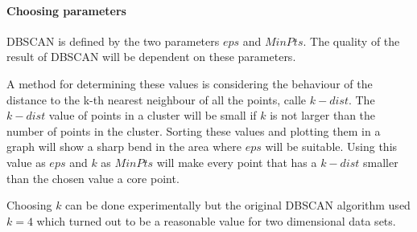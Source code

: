 \paragraph{Choosing parameters}
DBSCAN is defined by the two parameters $ eps $ and $ MinPts $.
The quality of the result of DBSCAN will be dependent on these parameters.

A method for determining these values is considering the behaviour of the distance to the k-th nearest neighbour of all the points, calle $ k-dist $.
The $ k-dist $ value of points in a cluster will be small if $ k $ is not larger than the number of points in the cluster.
Sorting these values and plotting them in a graph will show a sharp bend in the area where $ eps $ will be suitable. 
Using this value as $ eps $ and $ k $ as $MinPts$ will make every point that has a $ k-dist $ smaller than the chosen value a core point.

Choosing $ k $ can be done experimentally but the original DBSCAN algorithm used $ k= 4 $ which turned out to be a reasonable value for two dimensional data sets.

